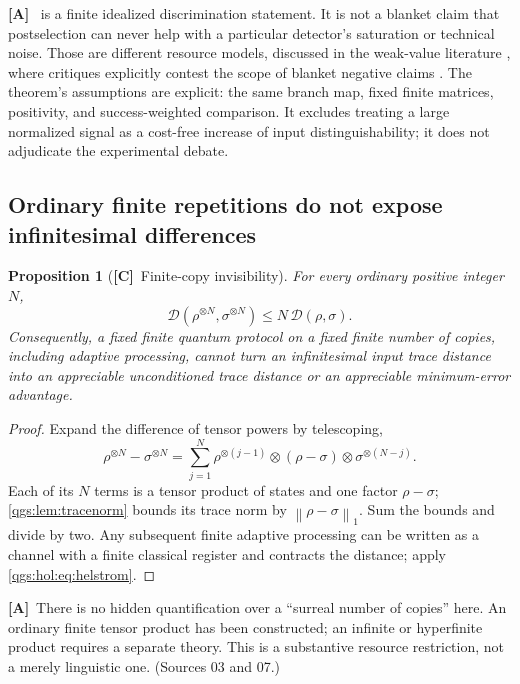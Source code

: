 \documentclass[11pt,oneside]{article}
\numberwithin{equation}{section}
\theoremstyle{plain}
\newtheorem{proposition}[proposition]{Proposition}
\theoremstyle{definition}
\theoremstyle{remark}
\newcommand{\TD}{\mathcal D}
\newcommand{\norm}[1]{\left\|#1\right\|}
\newcommand{\TC}{\textcolor{TierC}{\textsf{\bfseries[C]}}}
\newcommand{\TA}{\textcolor{TierA}{\textsf{\bfseries[A]}}}
\begin{document}
\TA\  is a finite idealized discrimination statement. It is not a blanket claim that postselection can never help with a particular detector's saturation or technical noise. Those are different resource models, discussed in the weak-value literature \cite{FerrieCombes,JordanEtAl,Torres}, where critiques explicitly contest the scope of blanket negative claims \cite{Vaidman}. The theorem's assumptions are explicit: the same branch map, fixed finite matrices, positivity, and success-weighted comparison. It excludes treating a large normalized signal as a cost-free increase of input distinguishability; it does not adjudicate the experimental debate.

\subsection{Ordinary finite repetitions do not expose infinitesimal differences}\label{qgs:sec:copies}
\begin{proposition}[\TC\ Finite-copy invisibility]\label{qgs:prop:copies}
For every ordinary positive integer $N$,
\[
 \TD(\rho^{\otimes N},\sigma^{\otimes N})\le N\,\TD(\rho,\sigma).
\]
Consequently, a fixed finite quantum protocol on a fixed finite number of copies, including adaptive processing, cannot turn an infinitesimal input trace distance into an appreciable unconditioned trace distance or an appreciable minimum-error advantage.
\end{proposition}
\begin{proof}
Expand the difference of tensor powers by telescoping,
\[
 \rho^{\otimes N}-\sigma^{\otimes N}=\sum_{j=1}^N\rho^{\otimes(j-1)}\otimes(\rho-\sigma)\otimes\sigma^{\otimes(N-j)}.
\]
Each of its $N$ terms is a tensor product of states and one factor $\rho-\sigma$; \cref{qgs:lem:tracenorm} bounds its trace norm by $\norm{\rho-\sigma}_1$. Sum the bounds and divide by two. Any subsequent finite adaptive processing can be written as a channel with a finite classical register and contracts the distance; apply \eqref{qgs:hol:eq:helstrom}.
\end{proof}

\TA\ There is no hidden quantification over a ``surreal number of copies'' here. An ordinary finite tensor product has been constructed; an infinite or hyperfinite product requires a separate theory. This is a substantive resource restriction, not a merely linguistic one. (Sources 03 and 07.)
\end{document}
